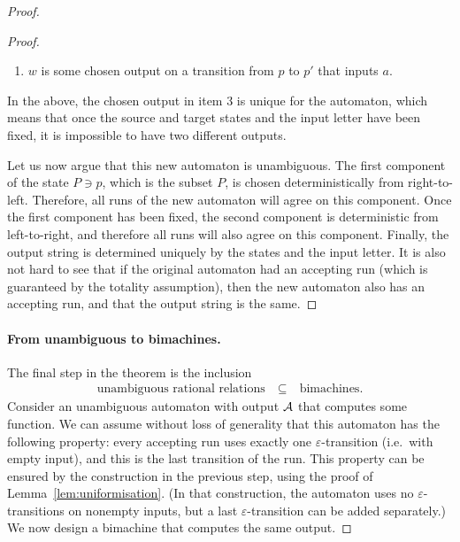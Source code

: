 \begin{proof}
\begin{proof}
\begin{itemize}
\begin{enumerate}
            \item $w$ is some chosen output on a transition from $p$ to $p'$ that inputs $a$.
        \end{enumerate}
        In the above, the chosen output in item 3 is unique for the automaton, which means that once the source and target states and the input letter have been fixed, it is impossible to have two different outputs.
        \end{itemize}
    Let us now argue that this new automaton is unambiguous. The first component of the state $P \ni p$, which is the subset $P$, is chosen deterministically from right-to-left. Therefore, all runs of the new automaton will agree on this component. Once the first component has been fixed, the second component is deterministic from left-to-right, and therefore all runs will also agree on this component. Finally, the output string is determined uniquely by the states and the input letter. It is also not hard to see that if the original automaton had an accepting run (which is guaranteed by the totality assumption), then the new automaton also has an accepting run, and that the output string is the same.
\end{proof}

\paragraph*{From unambiguous to bimachines.}
The final step in the theorem is the inclusion
\begin{align*}
\text{unambiguous rational relations} \quad \subseteq \quad \text{bimachines.}
\end{align*}
Consider an unambiguous automaton with output ${\mathcal A}$ that computes some function. We can assume without loss of generality that this automaton has the following property: every accepting run uses exactly one $\varepsilon$-transition (i.e.~with empty input), and this is the last transition of the run. This property can be ensured by the construction in the previous step, using the proof of Lemma~\ref{lem:uniformisation}. (In that construction, the automaton uses no $\varepsilon$-transitions on nonempty inputs, but a last $\varepsilon$-transition can be added separately.)
We now design a bimachine that computes the same output.


\end{proof}
